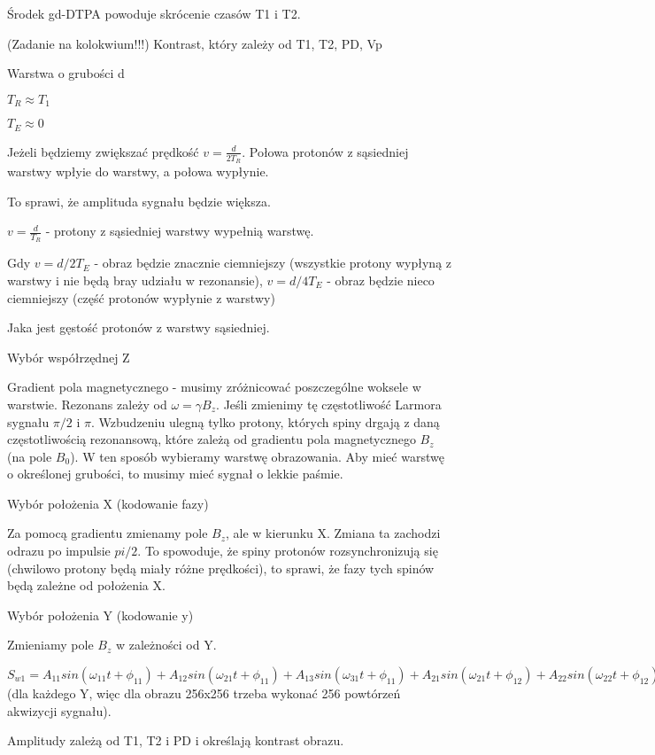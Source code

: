 \documentclass{article}
\begin{document}
Środek gd-DTPA powoduje skrócenie czasów T1 i T2.

(Zadanie na kolokwium!!!) Kontrast, który zależy od T1, T2, PD, Vp

Warstwa o grubości d

$T_R \approx T_1$

$T_E \approx 0$

Jeżeli będziemy zwiększać prędkość $v=\frac{d}{2T_R}$. Połowa protonów z sąsiedniej warstwy wpłyie do warstwy, a połowa wypłynie.

To sprawi, że amplituda sygnału będzie większa.

$v = \frac{d}{T_R}$ - protony z sąsiedniej warstwy wypełnią warstwę.

Gdy $v = d/2T_E$ - obraz będzie znacznie ciemniejszy (wszystkie protony wypłyną z warstwy i nie będą bray udziału w rezonansie), $v = d/4T_E$ - obraz będzie nieco ciemniejszy (część protonów wypłynie z warstwy)

Jaka jest gęstość protonów z warstwy sąsiedniej.

Wybór współrzędnej Z

Gradient pola magnetycznego - musimy zróżnicować poszczególne woksele w warstwie. Rezonans zależy od $\omega = \gamma B_z$. Jeśli zmienimy tę częstotliwość Larmora sygnału $\pi /2$ i $\pi$. Wzbudzeniu ulegną tylko protony, których spiny drgają z daną częstotliwością rezonansową, które zależą od gradientu pola magnetycznego $B_z$ (na pole $B_0$). W ten sposób wybieramy warstwę obrazowania. Aby mieć warstwę o określonej grubości, to musimy mieć sygnał o lekkie paśmie. 

Wybór położenia X (kodowanie fazy)

Za pomocą gradientu zmienamy pole $B_z$, ale w kierunku X. Zmiana ta zachodzi odrazu po impulsie $pi/2$. To spowoduje, że spiny protonów rozsynchronizują się (chwilowo protony będą miały różne prędkości), to sprawi, że fazy tych spinów będą zależne od położenia X.

Wybór położenia Y (kodowanie y)

Zmieniamy pole $B_z$ w zależności od Y. 

$S_{w1} = A_{11}sin(\omega_{11} t + \phi_{11}) + A_{12}sin(\omega_{21} t + \phi_{11}) + A_{13}sin(\omega_{31} t + \phi_{11}) + A_{21}sin(\omega_{21} t + \phi_{12}) + A_{22}sin(\omega_{22} t + \phi_{12}) + ...$ (dla każdego Y, więc dla obrazu 256x256 trzeba wykonać 256 powtórzeń akwizycji sygnału).

Amplitudy zależą od T1, T2 i PD i określają kontrast obrazu.
\end{document}
